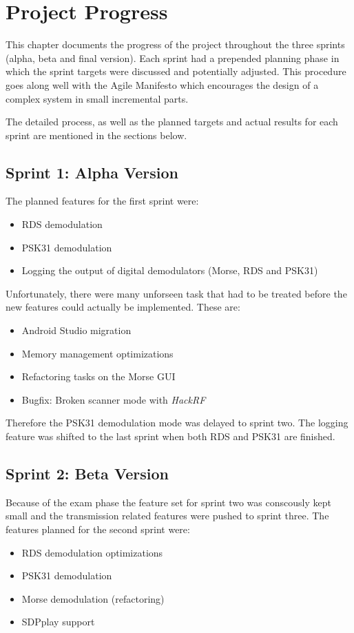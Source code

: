 \chapter{Project Progress\label{ch:project_progress}}

This chapter documents the progress of the project throughout the three
sprints (alpha, beta and final version). Each sprint had a prepended
planning phase in which the sprint targets were discussed and potentially
adjusted. This procedure goes along well with the Agile Manifesto which
encourages the design of a complex system in small incremental parts.

The detailed process, as well as the planned targets and actual
results for each sprint are mentioned in the sections below.

\section{Sprint 1: Alpha Version}

The planned features for the first sprint were:
\begin{itemize}
	\item RDS demodulation
	\item PSK31 demodulation
	\item Logging the output of digital demodulators (Morse, RDS and PSK31)
\end{itemize}

Unfortunately, there were many unforseen task that had to be treated
before the new features could actually be implemented. These are:
\begin{itemize}
	\item Android Studio migration
	\item Memory management optimizations
	\item Refactoring tasks on the Morse \ac{GUI}
	\item Bugfix: Broken scanner mode with \emph{HackRF}
\end{itemize}

Therefore the PSK31 demodulation mode was delayed to sprint two. The
logging feature was shifted to the last sprint when both RDS and
PSK31 are finished.


\section{Sprint 2: Beta Version}

Because of the exam phase the feature set for sprint two was conscously
kept small and the transmission related features were pushed to sprint
three. The features planned for the second sprint were:
\begin{itemize}
	\item RDS demodulation optimizations
	\item PSK31 demodulation
	\item Morse demodulation (refactoring)
	\item SDPplay support
\end{itemize}

